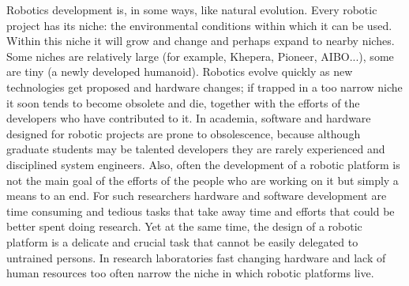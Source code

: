 Robotics development is, in some ways, like natural 
evolution. Every robotic project has its niche:
the environmental conditions within which it can be
used.  Within this niche it will grow and change and 
perhaps expand to nearby niches.
Some niches are relatively large (for example, Khepera, Pioneer, 
AIBO...), some are tiny (a newly developed humanoid). 
Robotics evolve quickly 
as new technologies get proposed and hardware changes; if trapped 
in a too narrow niche it soon tends to become obsolete and die, 
together with the efforts of the developers who have contributed 
to it. In academia, software and hardware designed for robotic 
projects are prone to obsolescence, 
because although graduate students may be 
talented developers they are rarely
experienced and disciplined system engineers.
Also, often the development of a robotic platform is not the main goal 
of the efforts of the people who are working on it but
simply a means to an end.
For such researchers hardware and software development are time 
consuming and tedious tasks that take away time and efforts that 
could be better spent doing research. Yet at the same time, the 
design of a robotic platform is a delicate and crucial task that 
cannot be easily delegated to untrained persons. In research 
laboratories fast changing hardware and lack of human resources 
too often narrow the niche in which robotic platforms live.


